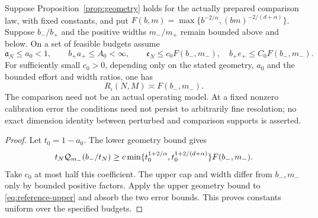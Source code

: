 \begin{corollary}\label{cor:reference-geometry}
Suppose Proposition~\ref{prop:geometry} holds for the actually prepared comparison law, with fixed constants, and put
$F(b,m)=\max\{b^{-2/\alpha},(bm)^{-2/(d+\alpha)}\}$.
Suppose $b_-/b_+$ and the positive widths $m_-/m_+$ remain bounded above and below. On a set of feasible budgets assume
\[
 \mathfrak a_N\le a_0<1,\qquad b_+a_+\le A_0<\infty,
 \qquad \mathfrak e_N\le c_0F(b_-,m_-),\quad
 b_+e_+\le C_0F(b_-,m_-).
\]
For sufficiently small $c_0>0$, depending only on the stated geometry, $a_0$ and the bounded effort and width ratios, one has
\[
 R_\iota(N,M)\asymp F(b_-,m_-).
\]
The comparison need not be an actual operating model. At a fixed nonzero calibration error the conditions need not persist to arbitrarily fine resolution; no exact dimension identity between perturbed and comparison supports is asserted.
\end{corollary}
\begin{proof}
Let $t_0=1-a_0$. The lower geometry bound gives
\[t_N\mathcal Q_{m_-}(b_-/t_N)\ge c\min\{t_0^{1+2/\alpha},t_0^{1+2/(d+\alpha)}\}F(b_-,m_-).\]
Take $c_0$ at most half this coefficient. The upper cap and width differ from $b_-,m_-$ only by bounded positive factors. Apply the upper geometry bound to \eqref{eq:reference-upper} and absorb the two error bounds. This proves constants uniform over the specified budgets.
\end{proof}
